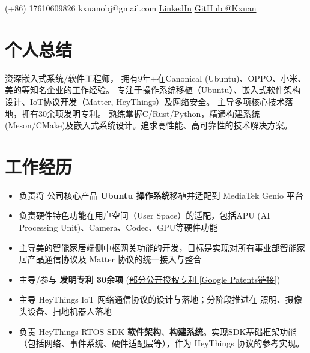 \documentclass{resume}
\begin{document}


\contactInfo
{(+86) 17610609826}
{kxuanobj@gmail.com}
{\href{https://www.linkedin.com/in/\%E5\%8F\%AC\%E8\%BD\%A9-\%E7\%BF\%9F-29463a115/}{LinkedIn}}
{\href{https://github.com/kxuan}{GitHub @Kxuan}}{}

\section{个人总结}
{
资深嵌入式系统/软件工程师，
拥有9年+在Canonical (Ubuntu)、OPPO、小米、美的等知名企业的工作经验。
专注于操作系统移植（Ubuntu）、嵌入式软件架构设计、IoT协议开发（Matter, HeyThings）及网络安全。
主导多项核心技术落地，拥有30余项发明专利。
熟练掌握C/Rust/Python，精通构建系统(Meson/CMake)及嵌入式系统设计。追求高性能、高可靠性的技术解决方案。
}

\section{工作经历}
\begin{itemize}
  \item 负责将 公司核心产品 \textbf{Ubuntu 操作系统}移植并适配到 MediaTek Genio 平台
  \item 负责硬件特色功能在用户空间（User Space）的适配，包括APU (AI Processing Unit)、Camera、Codec、GPU等硬件功能
\end{itemize}

\begin{itemize}
  \item 主导美的智能家居端侧中枢网关功能的开发，目标是实现对所有事业部智能家居产品通信协议及 Matter 协议的统一接入与整合
\end{itemize}

\begin{itemize}
  \item 主导/参与 \textbf{发明专利 30余项} (\href{https://patents.google.com/?inventor=\%E7\%BF\%9F\%E5\%8F\%AC\%E8\%BD\%A9\&oq=\%E7\%BF\%9F\%E5\%8F\%AC\%E8\%BD\%A9}{部分公开授权专利 [Google Patents链接]})
  \item 主导 HeyThings IoT 网络通信协议的设计与落地；分阶段推进在 照明、摄像头设备、扫地机器人落地
  \item 负责 HeyThings RTOS SDK \textbf{软件架构}、\textbf{构建系统}。实现SDK基础框架功能（包括网络、事件系统、硬件适配层等），作为 HeyThings 协议的参考实现。
\end{itemize}
\end{document}
